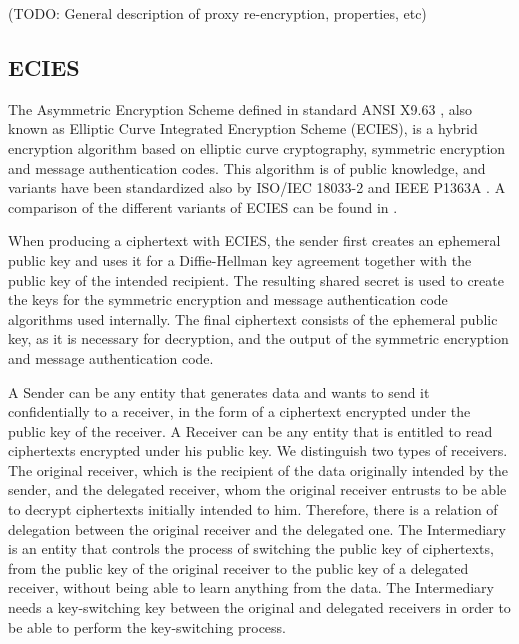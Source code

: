 \documentclass[12pt]{article}
\begin{document}
(TODO: General description of proxy re-encryption, properties, etc)

\subsection{ECIES}

The Asymmetric Encryption Scheme defined in standard ANSI X9.63 \cite{ansi-x9.63}, also known as Elliptic Curve Integrated Encryption Scheme (ECIES), is a hybrid encryption algorithm based on elliptic curve cryptography, symmetric encryption and message authentication codes. 
This algorithm is of public knowledge, and variants have been standardized also by ISO/IEC 18033-2 \cite{iso-18033-2} and IEEE P1363A \cite{ieee-p1363a}. A comparison of the different variants of ECIES can be found in \cite{gayoso2015security}. 

When producing a ciphertext with ECIES, the sender first creates an ephemeral public key and uses it for a Diffie-Hellman key agreement together with the public key of the intended recipient. The resulting shared secret is used to create the keys for the symmetric encryption and message authentication code algorithms used internally. The final ciphertext consists of the ephemeral public key, as it is necessary for decryption, and the output of the symmetric encryption and message authentication code.

A Sender can  be any entity that generates data and wants to send it confidentially to a receiver, in the form of a ciphertext encrypted under the public key of the receiver. 
%
A Receiver can be any entity that is entitled to read ciphertexts encrypted under his public key. We distinguish two types of receivers. The original receiver, which is the recipient of the data originally intended by the sender, and the delegated receiver, whom the original receiver entrusts to be able to decrypt ciphertexts initially intended to him. Therefore, there is a relation of delegation between the original receiver and the delegated one. 
% 
The Intermediary is an entity that controls the process of switching the public key of ciphertexts, from the public key of the original receiver to the public key of a delegated receiver, without being able to learn anything from the data. The Intermediary needs a key-switching key between the original and delegated receivers in order to be able to perform the key-switching process.

\end{document}

